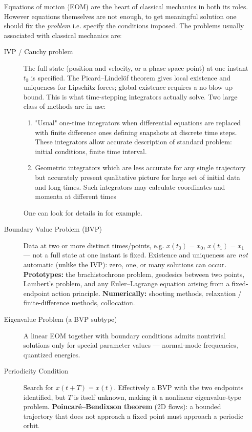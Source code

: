 Equations of motion (EOM) are the heart of classical mechanics in both its roles.
However equations themselves are not enough, to get meaningful solution
one should fix the \emph{problem} i.e. specify the conditions imposed.
The problems usually  associated with classical mechanics are:
\begin{description}
    \item [IVP / Cauchy problem]  The full state (position and velocity, or a
  phase-space point) at one instant $t_0$ is specified.
   The Picard--Lindel\"of theorem gives
  local existence and uniqueness for Lipschitz forces; global existence
  requires a no-blow-up bound.
   This is what time-stepping integrators  actually solve.
Two large class of methods are in use: 
\begin{enumerate} 
    \item "Usual" one-time integrators when differential equations are replaced
        with finite difference ones defining snapshots at discrete time steps.
        These integrators allow accurate description of standard problem:
        initial conditions, finite time interval. 
\item Geometric integrators which are less accurate for any single trajectory
    but accurately present qualitative picture for large set of initial data
        and long times. Such integrators may calculate  coordinates and momenta
        at different times
\end{enumerate}
One can look for details in \cite{HairerLubichWanner2006} for example.

    \item [Boundary Value Problem (BVP)] Data at two or more distinct times/points,
  e.g. $x(t_0) = x_0$, $x(t_1) = x_1$ --- not a full state at one
  instant is fixed.
   Existence and uniqueness are \emph{not} automatic (unlike the
  IVP): zero, one, or many solutions can occur.
   \textbf{Prototypes:} the brachistochrone problem, geodesics
  between two points, Lambert's problem, and any Euler--Lagrange
  equation arising from a fixed-endpoint action principle.
   \textbf{Numerically:} shooting methods, relaxation /
  finite-difference methods, collocation.

    \item [Eigenvalue Problem (a BVP subtype)] A linear EOM together with boundary conditions admits
  nontrivial solutions only for special parameter values ---
  normal-mode frequencies, quantized energies.

    \item [Periodicity Condition] Search for $x(t+T) = x(t)$. Effectively a BVP with the two
  endpoints identified, but $T$ is itself unknown, making it a
  nonlinear eigenvalue-type problem.
   \textbf{Poincar\'e--Bendixson theorem} (2D flows): a bounded
  trajectory that does not approach a fixed point must approach a
  periodic orbit.


\end{description}
